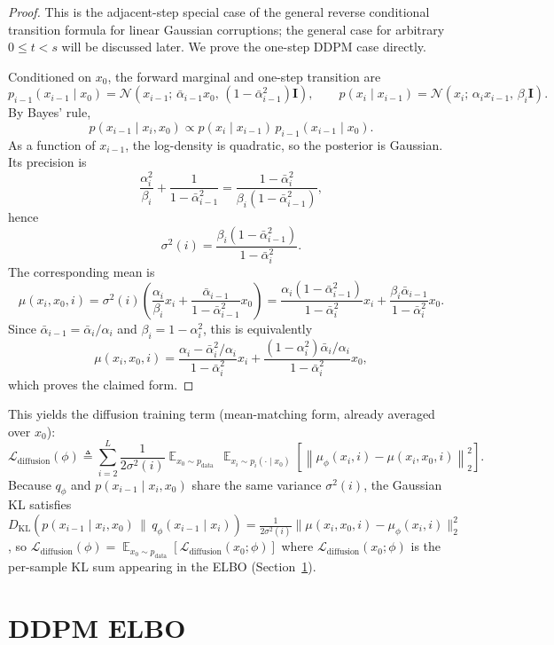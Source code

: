 \documentclass[11pt,a4paper]{article}
\DeclareMathOperator*{\E}{\mathbb{E}}
\newcommand{\cN}{\mathcal{N}}
\newcommand{\KL}[2]{D_{\mathrm{KL}}\!\left(#1\,\|\,#2\right)}
\newcommand{\balpha}{\bar{\alpha}}
\newcommand{\pdata}{p_{\mathrm{data}}}
\newcommand{\Ldiff}{\mathcal{L}_{\text{diffusion}}}
\begin{document}
\begin{proof}
This is the adjacent-step special case of the general reverse conditional
transition formula for linear Gaussian corruptions; the general case for
arbitrary $0\le t<s$ will be discussed later.
We prove the one-step DDPM case directly.

Conditioned on $x_0$, the forward marginal and one-step transition are
\[
p_{i-1}(x_{i-1}\mid x_0)
=\cN\!\left(x_{i-1};\,\balpha_{i-1}x_0,\,(1-\balpha_{i-1}^2)\mathbf{I}\right),
\qquad
p(x_i\mid x_{i-1})
=\cN\!\left(x_i;\,\alpha_i x_{i-1},\,\beta_i\mathbf{I}\right).
\]
By Bayes' rule,
\[
p(x_{i-1}\mid x_i,x_0)
\propto
p(x_i\mid x_{i-1})\,p_{i-1}(x_{i-1}\mid x_0).
\]
As a function of $x_{i-1}$, the log-density is quadratic, so the posterior is
Gaussian.
Its precision is
\[
\frac{\alpha_i^2}{\beta_i}
+\frac{1}{1-\balpha_{i-1}^2}
=\frac{1-\balpha_i^2}{\beta_i(1-\balpha_{i-1}^2)},
\]
hence
\[
\sigma^2(i)
=\frac{\beta_i(1-\balpha_{i-1}^2)}{1-\balpha_i^2}.
\]
The corresponding mean is
\[
\mu(x_i,x_0,i)
=\sigma^2(i)\!\left(
\frac{\alpha_i}{\beta_i}x_i
+\frac{\balpha_{i-1}}{1-\balpha_{i-1}^2}x_0
\right)
=\frac{\alpha_i(1-\balpha_{i-1}^2)}{1-\balpha_i^2}x_i
+\frac{\beta_i\balpha_{i-1}}{1-\balpha_i^2}x_0.
\]
Since $\balpha_{i-1}=\balpha_i/\alpha_i$ and $\beta_i=1-\alpha_i^2$, this is
equivalently
\[
\mu(x_i,x_0,i)
=\frac{\alpha_i-\balpha_i^2/\alpha_i}{1-\balpha_i^2}x_i
+\frac{(1-\alpha_i^2)\balpha_i/\alpha_i}{1-\balpha_i^2}x_0,
\]
which proves the claimed form.
\end{proof}

This yields the diffusion training term (mean-matching form,
already averaged over $x_0$):
\[
\Ldiff(\phi)
\triangleq
\sum_{i=2}^{L}
\frac{1}{2\sigma^2(i)}
\E_{x_0\sim\pdata}\,\E_{x_i\sim p_i(\cdot\mid x_0)}
\!\left[
\left\|
\mu_\phi(x_i,i)-\mu(x_i,x_0,i)
\right\|_2^2
\right].
\]
Because $q_\phi$ and $p(x_{i-1}\mid x_i,x_0)$ share the same variance $\sigma^2(i)$,
the Gaussian KL satisfies
$\KL{p(x_{i-1}\mid x_i,x_0)}{q_\phi(x_{i-1}\mid x_i)}
=\frac{1}{2\sigma^2(i)}\|\mu(x_i,x_0,i)-\mu_\phi(x_i,i)\|_2^2$,
so $\Ldiff(\phi)=\E_{x_0\sim\pdata}[\Ldiff(x_0;\phi)]$ where $\Ldiff(x_0;\phi)$ is the
per-sample KL sum appearing in the ELBO (Section~\ref{sec:elbo}).

\section{DDPM ELBO}\label{sec:elbo}
\end{document}
